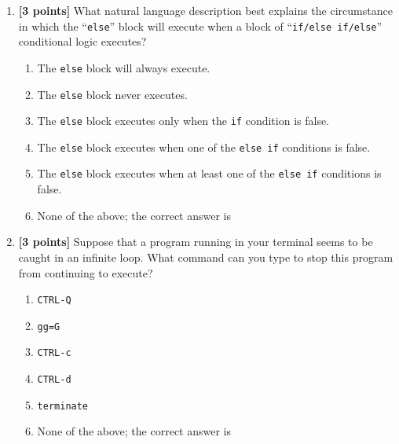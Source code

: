 \documentclass[12pt]{article}
\begin{document}
\begin{enumerate}

\item {\bf [3 points]}
What natural language description best explains the circumstance in which the ``{\tt else}'' block will
execute when a block of ``{\tt if/else if/else}'' conditional logic executes?
\begin{enumerate}
  \item The {\tt else} block will always execute.

\medskip
\item The {\tt else} block never executes.

\medskip
\item The {\tt else} block executes only when the {\tt if} condition is false.

\medskip 
\item The {\tt else} block executes when one of the {\tt else if} conditions is false.

\medskip 
\item The {\tt else} block executes when at least one of the {\tt else if} conditions is false.

\medskip
\item None of the above; the correct answer is \underline{\hspace{3in}}
\end{enumerate}

\bigskip
\bigskip
\bigskip
\bigskip

\item {\bf [3 points]}
  Suppose that a program running in your terminal seems to be caught in an infinite loop. What command can you
  type to stop this program from continuing to execute?
  \begin{enumerate}
    \item {\tt CTRL-Q}
      \medskip 
    \item {\tt gg=G}
      \medskip
    \item {\tt CTRL-c}
      \medskip 
    \item {\tt CTRL-d}
      \medskip
    \item {\tt terminate}
      \medskip
\item None of the above; the correct answer is \underline{\hspace{3in}}
  \end{enumerate}

\bigskip
\bigskip
\bigskip


\end{enumerate}
\end{document}
